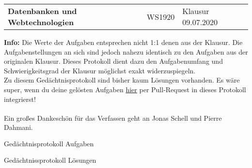 \documentclass[DIV=16,parskip]{scrartcl} %
\begin{document}

\begin{flushleft}
    \begin{tabu} {@{}X[l]X[c]X[r]@{}}
        {\LARGE{\textbf{Datenbanken und Webtechnologien}}} & {\Large{WS1920}} & {\textnormal{Klausur 09.07.2020}} \\
    \end{tabu}
\end{flushleft}

\vspace{24pt}

\newcommand{\udensdash}[1]{%
    \tikz[baseline=(todotted.base)]{
        \node[inner sep=1pt,outer sep=0pt] (todotted) {#1};
        \draw[densely dashed] (todotted.south west) -- (todotted.south east);
    }%
}%

\textbf{Info:} Die Werte der Aufgaben entsprechen nicht 1:1 denen aus der Klausur.
Die Aufgabenstellungen an sich sind jedoch nahezu identisch zu den Aufgaben aus
der originalen Klausur. Dieses Protokoll dient dazu den Aufgabenumfang und
Schwierigkeitsgrad der Klausur möglichst exakt widerzuspiegeln.\\
Zu diesem Gedächtnisprotokoll sind bisher kaum Lösungen vorhanden. Es wäre super,
wenn du deine gelösten Aufgaben \href{https://github.com/Pierrefha/dbwt-exam-protocol}
{hier} per Pull-Request in dieses Protokoll integrierst!\\\\
Ein großes Dankeschön für das Verfassen geht an Jonas Schell und Pierre Dahmani.


\begin{section}{Gedächtnisprotokoll Aufgaben}
    
    
    
    
    
    
    
\end{section}
\pagebreak
\begin{section}{Gedächtnissprotokoll Lösungen}
    
\end{section}
\end{document}
